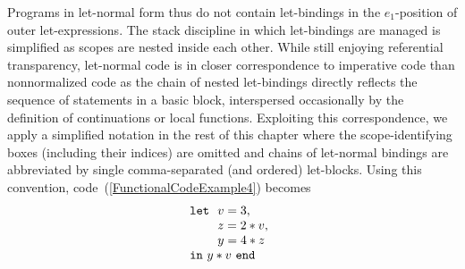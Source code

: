 Programs in let-normal form thus do not contain let-bindings in the
$e_1$-position of outer let-expressions. The stack discipline in which
let-bindings are managed is simplified as scopes are nested inside
each other.
While still enjoying referential transparency, let-normal code is in
closer correspondence to imperative code than nonnormalized code as
the chain of nested let-bindings directly reflects the sequence of
statements in a basic block, interspersed occasionally by the
definition of continuations or local functions. Exploiting this
correspondence, we apply a simplified notation in the rest of this
chapter where the scope-identifying boxes (including their indices)
are omitted and chains of let-normal bindings are abbreviated by
single comma-separated (and ordered) let-blocks. Using this
convention, code~(\ref{FunctionalCodeExample4}) becomes
\begin{equation}
\label{FunctionalCodeExample5}
\begin{array}{l}
\mathtt{let}\, \begin{array}[t]{l}
                 v = 3,\\
                 z=2*v, \\
                 y = 4*z
             \end{array}\\ 
\mathtt{in}\ y*v\ \mathtt{end}
\end{array}
\end{equation}




